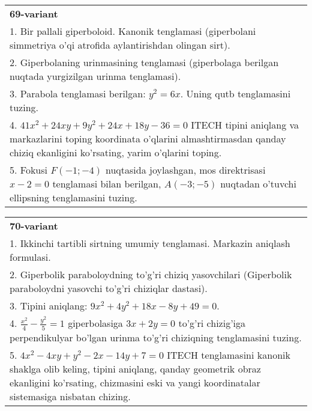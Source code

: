 \documentclass{article}
\begin{document}
\begin{tabular}{m{17cm}}
\textbf{69-variant}\\
1. Bir pallali giperboloid. Kanonik tenglamasi (giperbolani simmetriya o'qi atrofida aylantirishdan olingan sirt).\\

2. Giperbolaning urinmasining tenglamasi (giperbolaga berilgan nuqtada yurgizilgan urinma tenglamasi).\\

3. Parabola tenglamasi berilgan: $y^2=6x$. Uning qutb tenglamasini tuzing.\\

4. $41x^{2} + 24xy + 9y^{2} + 24x + 18y - 36 = 0$ ITECH tipini aniqlang va markazlarini toping koordinata o'qlarini almashtirmasdan qanday chiziq ekanligini ko'rsating, yarim o'qlarini toping.  \\

5. Fokusi $F( - 1; - 4)$ nuqtasida joylashgan, mos direktrisasi $x - 2 = 0$ tenglamasi bilan berilgan, $A( - 3; - 5)$ nuqtadan o'tuvchi ellipsning tenglamasini tuzing.  
\end{tabular}
\vspace{1cm}


\begin{tabular}{m{17cm}}
\textbf{70-variant}\\
1. Ikkinchi tartibli sirtning umumiy tenglamasi. Markazin aniqlash formulasi.\\

2. Giperbolik paraboloydning to'g'ri chiziq yasovchilari (Giperbolik paraboloydni yasovchi to'g'ri chiziqlar dastasi).\\

3. Tipini aniqlang: $9x^{2}+4y^{2}+18x-8y+49=0$.\\

4. $\frac{x^{2}}{4} - \frac{y^{2}}{5} = 1$ giperbolasiga $3x + 2y = 0$ to'g'ri chizig'iga perpendikulyar bo'lgan urinma to'g'ri chiziqning tenglamasini tuzing.\\

5. $4x^{2} - 4xy + y^{2} - 2x - 14y + 7 = 0$ ITECH tenglamasini kanonik shaklga olib keling, tipini aniqlang, qanday geometrik obraz ekanligini ko'rsating, chizmasini eski va yangi koordinatalar sistemasiga nisbatan chizing.  
\end{tabular}
\vspace{1cm}
\end{document}
